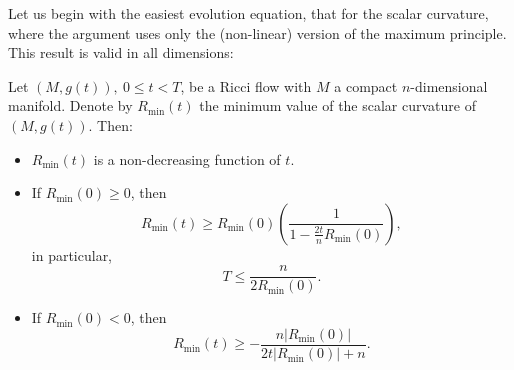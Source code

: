 Let us begin with the
easiest evolution equation, that for the scalar curvature, where the
argument uses only the (non-linear) version of the maximum
principle. This result is valid in all dimensions:


\begin{proposition}
\label{prop:scalar-curvature-min-evolution}
\label{scalarevol}
Let $(M,g(t)),\ 0\le t<T$, be a Ricci flow with $M$ a compact
$n$-dimensional manifold. Denote by $R_\mathrm{min}(t)$ the minimum
value of the scalar curvature of $(M,g(t))$. Then:
\begin{itemize} \item $R_\mathrm{min}(t)$ is a non-decreasing function
of $t$.
\item If $R_\mathrm{min}(0)\ge 0$, then
$$R_\mathrm{min}(t)\ge R_\mathrm{min}(0)\left(\frac{1}{1-\frac{2t}{n}R_\mathrm{min}(0)}\right),$$ in particular,
$$T\le\frac{n}{2R_\mathrm{min}(0)}.$$
\item If $R_\mathrm{min}(0)<0$, then
$$R_\mathrm{min}(t)\ge
-\frac{n\bigl| R_\mathrm{min}(0)\bigr|}{2t\bigl|R_\mathrm{min}(0)\bigr|+n}.$$
\end{itemize}
\end{proposition}


